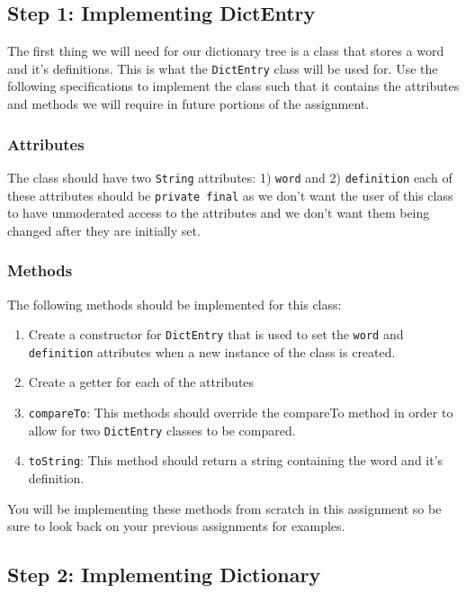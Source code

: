 \documentclass[a4paper]{article}
\begin{document}
\subsection{Step 1: Implementing DictEntry}

The first thing we will need for our dictionary tree is a class that stores a
word and it's definitions. This is what the \lstinline|DictEntry| class will be 
used for. Use the following specifications to implement the class such that it 
contains the attributes and methods we will require in future portions of the 
assignment.

\subsubsection*{Attributes}
The class should have two \lstinline|String| attributes: 1) \lstinline|word|
and 2) \lstinline|definition| each of these attributes should be
\lstinline|private final| as we don't want the user of this class to have
unmoderated access to the attributes and we don't want them being changed after
they are initially set. 

\subsubsection*{Methods}

The following methods should be implemented for this class:
\begin{enumerate}
    \item Create a constructor for \lstinline|DictEntry| that is used to set the \lstinline|word| and \lstinline|definition| attributes when a new instance of the class is created.
    \item Create a getter for each of the attributes
    \item \lstinline|compareTo|: This methods should override the compareTo method in order to allow for two \lstinline|DictEntry| classes to be compared.
    \item \lstinline|toString|: This method should return a string containing the word and it's definition.
\end{enumerate}

You will be implementing these methods from scratch in this assignment so be
sure to look back on your previous assignments for examples.

\subsection{Step 2: Implementing Dictionary}
\end{document}
